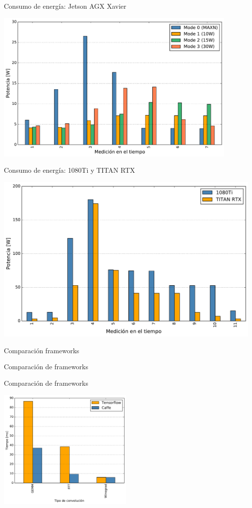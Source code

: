 \begin{frame}{Consumo de energía: Jetson AGX Xavier}

\centering
\includegraphics[width=0.9\textwidth]{barplot/power-xavier.pdf}
\end{frame}


\begin{frame}{Consumo de energía: 1080Ti y TITAN RTX}

\centering
\includegraphics[width=1\textwidth]{barplot/TITAN-1080.pdf}

\end{frame}


\begin{frame}
\centering
\huge
Comparación frameworks
\end{frame}

\begin{frame}{Comparación de frameworks}

  \newline
\centering
\resizebox{0.6\linewidth}{!}{

}

\end{frame}

\begin{frame}{Comparación de frameworks}

\centering
\includegraphics[width=0.5\textwidth]{barplot/tfc-conv.pdf}

\end{frame}